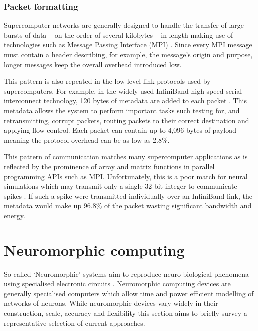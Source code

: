 			
			\subsubsection{Packet formatting}
				
				Supercomputer networks are generally designed to handle the transfer of
				large bursts of data -- on the order of several kilobytes -- in length
				making use of technologies such as Message Passing Interface (MPI)
				\cite{mpiforum12}. Since every MPI message must contain a header
				describing, for example, the message's origin and purpose, longer
				messages keep the overall overhead introduced low.
				
				This pattern is also repeated in the low-level link protocols used by
				supercomputers.  For example, in the widely used InfiniBand high-speed
				serial interconnect technology, 120 bytes of metadata are added to each
				packet \cite{infinibandta08}. This metadata allows the system to perform
				important tasks such testing for, and retransmitting, corrupt packets,
				routing packets to their correct destination and applying flow control.
				Each packet can contain up to 4,096 bytes of payload meaning the
				protocol overhead can be as low as 2.8\%.
				
				This pattern of communication matches many supercomputer applications
				as is reflected by the prominence of array and matrix functions in
				parallel programming APIs such as MPI. Unfortunately, this is a poor
				match for neural simulations which may transmit only a single 32-bit
				integer to communicate spikes \cite{davies12}. If such a spike were
				transmitted individually over an InfiniBand link, the metadata would
				make up 96.8\% of the packet wasting significant bandwidth and energy.
				
	
	
	\section{Neuromorphic computing}
		
		So-called `Neuromorphic' systems aim to reproduce neuro-biological phenomena
		using specialised electronic circuits \cite{mead90}. Neuromorphic computing
		devices are generally specialised computers which allow time and power
		efficient modelling of networks of neurons. While neuromorphic devices vary
		widely in their construction, scale, accuracy and flexibility this section
		aims to briefly survey a representative selection of current approaches.
		
